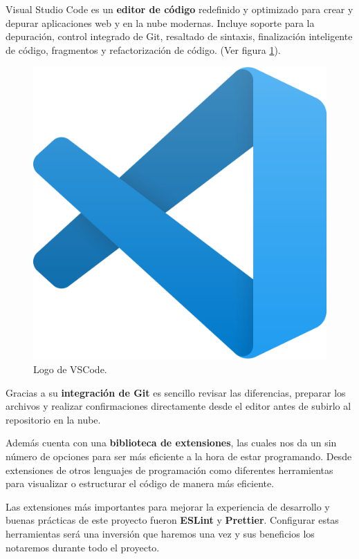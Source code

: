 \documentclass[12pt,twoside,titlepage]{report}
\begin{document}
Visual Studio Code es un \textbf{editor de código} redefinido y optimizado para crear y depurar aplicaciones web y en la nube modernas. Incluye soporte para la depuración, control integrado de Git, resaltado de sintaxis, finalización inteligente de código, fragmentos y refactorización de código.
(Ver figura \ref{fig:VSCodeLogo}).

\begin{figure}[H]
    \centering
    \includegraphics[scale=0.035]{VSCode/VSCode}
    \caption{Logo de VSCode.}
    \label{fig:VSCodeLogo}
\end{figure}

Gracias a su \textbf{integración de Git} es sencillo revisar las diferencias, preparar los archivos y realizar confirmaciones directamente desde el editor antes de subirlo al repositorio en la nube.

Además cuenta con una \textbf{biblioteca de extensiones}, las cuales nos da un sin número de opciones para ser más eficiente a la hora de estar programando. Desde extensiones de otros lenguajes de programación como diferentes herramientas para visualizar o estructurar el código de manera más eficiente.

Las extensiones más importantes para mejorar la experiencia de desarrollo y buenas prácticas de este proyecto fueron \textbf{ESLint} y \textbf{Prettier}. Configurar estas herramientas será una inversión que haremos una vez y sus beneficios los notaremos durante todo el proyecto.
\end{document}
